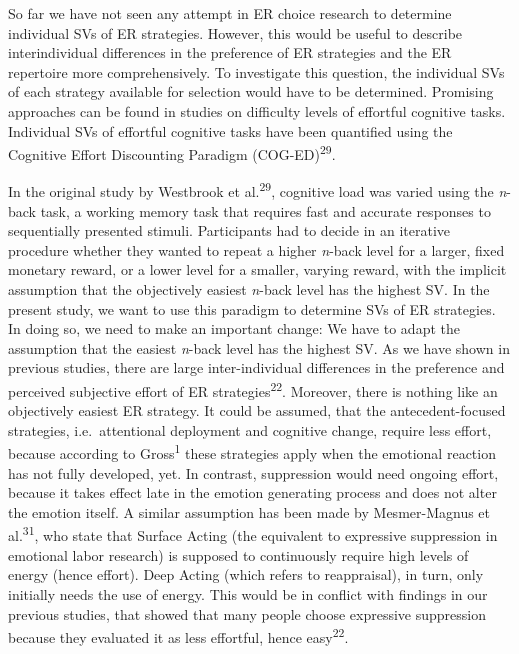 \documentclass[
  man,floatsintext]{apa6}
\begin{document}
So far we have not seen any attempt in ER choice research to determine individual SVs of ER strategies.
However, this would be useful to describe interindividual differences in the preference of ER strategies and the ER repertoire more comprehensively.
To investigate this question, the individual SVs of each strategy available for selection would have to be determined.
Promising approaches can be found in studies on difficulty levels of effortful cognitive tasks.\\
Individual SVs of effortful cognitive tasks have been quantified using the Cognitive Effort Discounting Paradigm (COG-ED)\textsuperscript{29}.

In the original study by Westbrook et al.\textsuperscript{29}, cognitive load was varied using the \emph{n}-back task, a working memory task that requires fast and accurate responses to sequentially presented stimuli.
Participants had to decide in an iterative procedure whether they wanted to repeat a higher \emph{n}-back level for a larger, fixed monetary reward, or a lower level for a smaller, varying reward, with the implicit assumption that the objectively easiest \emph{n}-back level has the highest SV.
In the present study, we want to use this paradigm to determine SVs of ER strategies.
In doing so, we need to make an important change: We have to adapt the assumption that the easiest \emph{n}-back level has the highest SV.
As we have shown in previous studies, there are large inter-individual differences in the preference and perceived subjective effort of ER strategies\textsuperscript{22}.
Moreover, there is nothing like an objectively easiest ER strategy.
It could be assumed, that the antecedent-focused strategies, i.e.~attentional deployment and cognitive change, require less effort, because according to Gross\textsuperscript{1} these strategies apply when the emotional reaction has not fully developed, yet.
In contrast, suppression would need ongoing effort, because it takes effect late in the emotion generating process and does not alter the emotion itself.
A similar assumption has been made by Mesmer-Magnus et al.\textsuperscript{31}, who state that Surface Acting (the equivalent to expressive suppression in emotional labor research) is supposed to continuously require high levels of energy (hence effort).
Deep Acting (which refers to reappraisal), in turn, only initially needs the use of energy.
This would be in conflict with findings in our previous studies, that showed that many people choose expressive suppression because they evaluated it as less effortful, hence easy\textsuperscript{22}.
\end{document}
